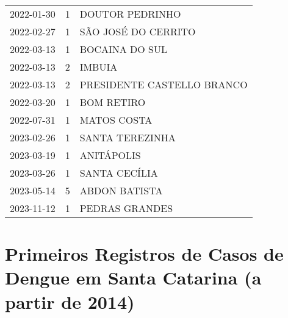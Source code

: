 \begin{longtable}[htbp]{ccl}
2022-01-30 & 1 & DOUTOR PEDRINHO \\
2022-02-27 & 1 & SÃO JOSÉ DO CERRITO \\
2022-03-13 & 1 & BOCAINA DO SUL \\
2022-03-13 & 2 & IMBUIA \\
2022-03-13 & 2 & PRESIDENTE CASTELLO BRANCO \\
2022-03-20 & 1 & BOM RETIRO \\
2022-07-31 & 1 & MATOS COSTA \\
2023-02-26 & 1 & SANTA TEREZINHA \\
2023-03-19 & 1 & ANITÁPOLIS \\
2023-03-26 & 1 & SANTA CECÍLIA \\
2023-05-14 & 5 & ABDON BATISTA \\
2023-11-12 & 1 & PEDRAS GRANDES \\
\end{longtable}

\chapter{Primeiros Registros de Casos de Dengue em Santa Catarina (a partir de 2014)} \label{primaCasos}

